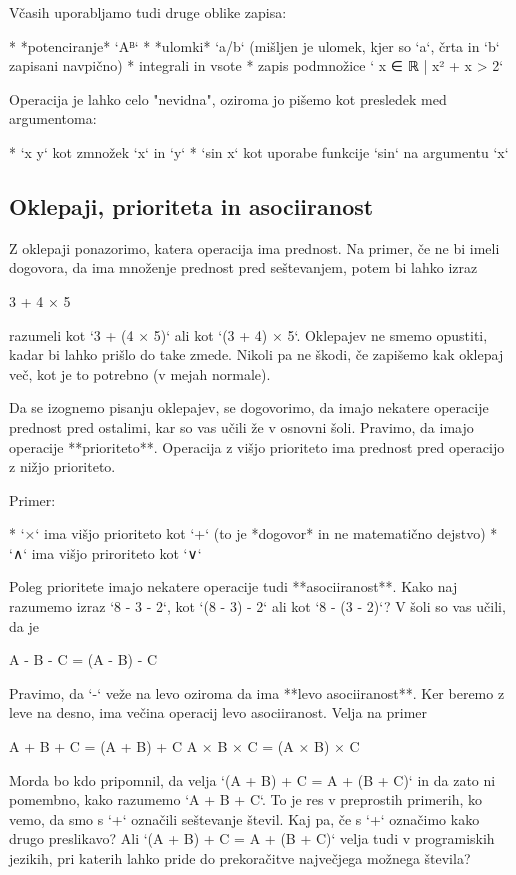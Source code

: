 Včasih uporabljamo tudi druge oblike zapisa:

* *potenciranje* `Aᴮ`
* *ulomki* `a/b` (mišljen je ulomek, kjer so `a`, črta in `b` zapisani navpično)
* integrali in vsote
* zapis podmnožice `{ x ∈ ℝ | x² + x > 2}`

Operacija je lahko celo "nevidna", oziroma jo pišemo kot presledek med argumentoma:

* `x y` kot zmnožek `x` in `y`
* `sin x` kot uporabe funkcije `sin` na argumentu `x`


\subsection{Oklepaji, prioriteta in asociiranost}

Z oklepaji ponazorimo, katera operacija ima prednost. Na primer, če ne bi imeli dogovora, da ima množenje prednost pred
seštevanjem, potem bi lahko izraz

    3 + 4 × 5

razumeli kot `3 + (4 × 5)` ali kot `(3 + 4) × 5`. Oklepajev ne smemo opustiti, kadar bi lahko prišlo do take zmede.
Nikoli pa ne škodi, če zapišemo kak oklepaj več, kot je to potrebno (v mejah normale).

Da se izognemo pisanju oklepajev, se dogovorimo, da imajo nekatere operacije prednost pred ostalimi, kar so vas učili že
v osnovni šoli. Pravimo, da imajo operacije **prioriteto**. Operacija z višjo prioriteto ima prednost pred operacijo z
nižjo prioriteto.

Primer:

* `×` ima višjo prioriteto kot `+` (to je *dogovor* in ne matematično dejstvo)
* `∧` ima višjo priroriteto kot `∨`

Poleg prioritete imajo nekatere operacije tudi **asociiranost**. Kako naj razumemo izraz `8 - 3 - 2`, kot `(8 - 3) - 2`
ali kot `8 - (3 - 2)`? V šoli so vas učili, da je

    A - B - C = (A - B) - C

Pravimo, da `-` veže na levo oziroma da ima **levo asociiranost**. Ker beremo z leve na desno, ima večina operacij levo
asociiranost. Velja na primer

    A + B + C = (A + B) + C
    A × B × C = (A × B) × C

Morda bo kdo pripomnil, da velja `(A + B) + C = A + (B + C)` in da zato ni pomembno, kako razumemo `A + B + C`. To je
res v preprostih primerih, ko vemo, da smo s `+` označili seštevanje števil. Kaj pa, če s `+` označimo kako drugo
preslikavo? Ali `(A + B) + C = A + (B + C)` velja tudi v programiskih jezikih, pri katerih lahko pride do prekoračitve
največjega možnega števila?

